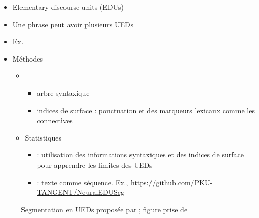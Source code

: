 \documentclass{KodeBook}
\begin{document}
\begin{itemize}
	\item Elementary discourse units (EDUs)
	\item Une phrase peut avoir plusieurs UEDs 
	\item Ex. 
	\item Méthodes 
	\begin{itemize}
		\item {}
		\begin{itemize}
			\item arbre syntaxique
			\item indices de surface : ponctuation et des marqueurs lexicaux comme les connectives
		\end{itemize}
		\item Statistiques 
		\begin{itemize}
			\item {} : utilisation des informations syntaxiques et des indices de surface pour apprendre les limites des UEDs
			\item {} : texte comme séquence. Ex., \url{https://github.com/PKU-TANGENT/NeuralEDUSeg}
		\end{itemize}
	\end{itemize}
\end{itemize}

\begin{figure}
	\centering
	\caption{Segmentation en UEDs proposée par \cite{2018-wang-al} ; figure prise de \cite{2019-jurafsky-martin}}
\end{figure}
\end{document}
